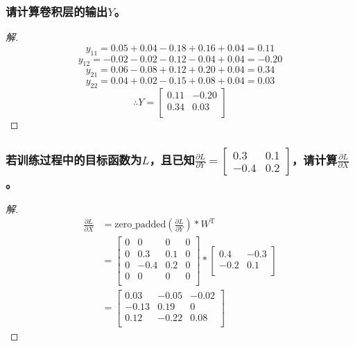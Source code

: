 \documentclass[a4paper]{article}
\begin{document}
\subsubsection{请计算卷积层的输出$Y$。}
\begin{proof}[解]
\[y_{11} = 0.05 + 0.04 - 0.18 + 0.16 + 0.04 = 0.11\]
\[y_{12} = -0.02 - 0.02 - 0.12 - 0.04 + 0.04 = -0.20\]
\[y_{21} = 0.06 - 0.08 + 0.12 + 0.20 + 0.04 = 0.34\]
\[y_{22} = 0.04 + 0.02 - 0.15 + 0.08 + 0.04 = 0.03\]
\[\therefore Y = \begin{bmatrix}
                0.11 & -0.20 \\
                0.34 & 0.03 \\
                \end{bmatrix}\]
\end{proof}

\subsubsection{若训练过程中的目标函数为$L$，且已知$\frac{\partial L}{\partial Y}=\left[ \begin{array}{cc}
    0.3 & 0.1 \\
    -0.4 & 0.2
\end{array} \right]$，请计算$\frac{\partial L}{\partial X}$。
}
\begin{proof}[解]
\begin{align*}
    \frac{\partial L}{\partial X} &= \mathrm{zero\_padded}(\frac{\partial L}{\partial Y}) * W^{\mathrm{T}} \\
    &= \begin{bmatrix}
        0 & 0 & 0 & 0 \\
        0 & 0.3 & 0.1 & 0 \\
        0 & -0.4 & 0.2 & 0 \\
        0 & 0 & 0 & 0 \\
    \end{bmatrix} *
    \begin{bmatrix}
        0.4 & -0.3 \\
        -0.2 & 0.1 \\
    \end{bmatrix} \\
    &= \begin{bmatrix}
        0.03 & -0.05 & -0.02 \\
        -0.13 & 0.19 & 0 \\
        0.12 & -0.22 & 0.08 \\
    \end{bmatrix}
\end{align*}
\end{proof}
\end{document}
